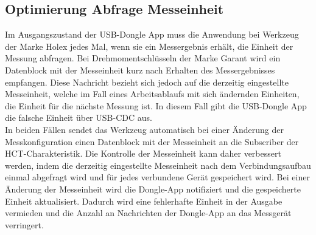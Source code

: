 \subsection{Optimierung Abfrage Messeinheit} 
Im Ausgangszustand der USB-Dongle App muss die Anwendung bei Werkzeug der Marke Holex jedes Mal, wenn sie ein Messergebnis erhält, die Einheit der Messung abfragen. Bei Drehmomentschlüsseln der Marke Garant wird ein Datenblock mit der Messeinheit kurz nach Erhalten des Messergebnisses empfangen. Diese Nachricht bezieht sich jedoch auf die derzeitig eingestellte Messeinheit, welche im Fall eines Arbeitsablaufs mit sich ändernden Einheiten, die Einheit für die nächste Messung ist. In diesem Fall gibt die USB-Dongle App die falsche Einheit über USB-CDC aus.\\
In beiden Fällen sendet das Werkzeug automatisch bei einer Änderung der Messkonfiguration einen Datenblock mit der Messeinheit an die Subscriber der HCT-Charakteristik. Die Kontrolle der Messeinheit kann daher verbessert werden, indem die derzeitig eingestellte Messeinheit nach dem Verbindungsaufbau einmal abgefragt wird und für jedes verbundene Gerät gespeichert wird. Bei einer Änderung der Messeinheit wird die Dongle-App notifiziert und die gespeicherte Einheit aktualisiert. Dadurch wird eine fehlerhafte Einheit in der Ausgabe vermieden und die Anzahl an Nachrichten der Dongle-App an das Messgerät verringert.

